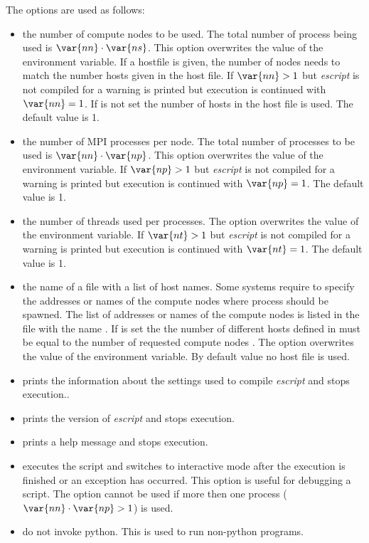 The options are used as follows:
\begin{itemize}

 \item[\programopt{-n} \var{nn}] the number of compute nodes  to be used. The total number of process being used is 
$\var{nn} \cdot \var{ns}$. This option overwrites the value of the  environment variable. 
If a hostfile is given, the number of nodes needs to match the number hosts given in the host file.
If $\var{nn}>1$ but {\it escript}  is not compiled for \MPI a warning is printed but execution is continued with $\var{nn}=1$. If  is not set the
number of hosts in the host file is used. The default value is 1.
 
\item[\programopt{-p} \var{np}] the number of MPI processes per node.  The total number of processes to be used is 
$\var{nn} \cdot \var{np}$. This option overwrites the value of the  environment variable. If $\var{np}>1$ but {\it escript}  is not compiled for \MPI a warning is printed but execution is continued with $\var{np}=1$. The default value is 1.

 \item[\programopt{-t} \var{nt}] the number of threads used per processes.
The option overwrites the value of the  environment variable.
If $\var{nt}>1$ but {\it escript} is not compiled for \OPENMP a warning is printed but execution is continued with $\var{nt}=1$. The default value is 1.

 \item[\programopt{-f} \var{hostfile}] the name of a file with a list of host names. Some systems require to specify the addresses or names of the compute nodes where \MPI process should be spawned. The list of addresses or names of the compute nodes is listed in the file with the name . If  is set the 
the number of different
hosts defined in  must be equal to the number of requested compute nodes . The option overwrites the value of the  environment variable. By default value no host file is used.
 \item[\programopt{-c}] prints the information about the settings used to compile {\it escript} and stops execution..
 \item[\programopt{-V}] prints the version of {\it escript} and stops execution.
 \item[\programopt{-h}] prints a help message and stops execution.
 \item[\programopt{-i}] executes the script  and switches to interactive mode after the execution is finished or an exception has occurred. This option is useful for debugging a script. The option cannot be used if more then one process ($\var{nn} \cdot \var{np}>1$) is used.
\item[\programopt{-b}] do not invoke python. This is used to run non-python programs.


\end{itemize}
